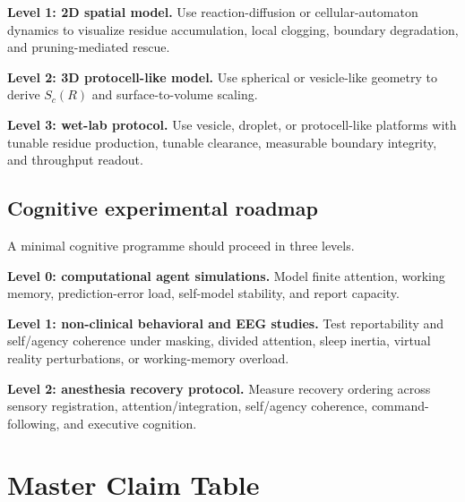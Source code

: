 \documentclass[10pt,a4paper,twocolumn,aps,prl]{revtex4-2}
\theoremstyle{claimstyle}
\theoremstyle{definition}
\newcommand{\claimfield}[1]{\noindent\textbf{#1.}}
\begin{document}
\claimfield{Level 1: 2D spatial model} Use reaction-diffusion or cellular-automaton dynamics to visualize residue accumulation, local clogging, boundary degradation, and pruning-mediated rescue.

\claimfield{Level 2: 3D protocell-like model} Use spherical or vesicle-like geometry to derive $S_c(R)$ and surface-to-volume scaling.

\claimfield{Level 3: wet-lab protocol} Use vesicle, droplet, or protocell-like platforms with tunable residue production, tunable clearance, measurable boundary integrity, and throughput readout.

\subsection{Cognitive experimental roadmap}

A minimal cognitive programme should proceed in three levels.

\claimfield{Level 0: computational agent simulations} Model finite attention, working memory, prediction-error load, self-model stability, and report capacity.

\claimfield{Level 1: non-clinical behavioral and EEG studies} Test reportability and self/agency coherence under masking, divided attention, sleep inertia, virtual reality perturbations, or working-memory overload.

\claimfield{Level 2: anesthesia recovery protocol} Measure recovery ordering across sensory registration, attention/integration, self/agency coherence, command-following, and executive cognition.

\section{Master Claim Table}
\end{document}
